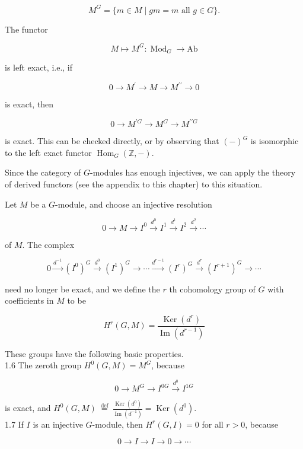 \documentclass[10pt]{article}
\begin{document}
$$
M^{G}=\{m \in M \mid g m=m \text { all } g \in G\} .
$$

The functor

$$
M \mapsto M^{G}: \operatorname{Mod}_{G} \rightarrow \mathrm{Ab}
$$

is left exact, i.e., if

$$
0 \rightarrow M^{\prime} \rightarrow M \rightarrow M^{\prime \prime} \rightarrow 0
$$

is exact, then

$$
0 \rightarrow M^{\prime G} \rightarrow M^{G} \rightarrow M^{\prime \prime G}
$$

is exact. This can be checked directly, or by observing that $(-)^{G}$ is isomorphic to the left exact functor $\operatorname{Hom}_{G}(\mathbb{Z},-)$.

Since the category of $G$-modules has enough injectives, we can apply the theory of derived functors (see the appendix to this chapter) to this situation.

Let $M$ be a $G$-module, and choose an injective resolution

$$
0 \rightarrow M \rightarrow I^{0} \xrightarrow{d^{0}} I^{1} \xrightarrow{d^{1}} I^{2} \xrightarrow{d^{2}} \cdots
$$

of $M$. The complex

$$
0 \xrightarrow{d^{-1}}\left(I^{0}\right)^{G} \xrightarrow{d^{0}}\left(I^{1}\right)^{G} \rightarrow \cdots \xrightarrow{d^{r-1}}\left(I^{r}\right)^{G} \xrightarrow{d^{r}}\left(I^{r+1}\right)^{G} \rightarrow \cdots
$$

need no longer be exact, and we define the $r$ th cohomology group of $G$ with coefficients in $M$ to be

$$
H^{r}(G, M)=\frac{\operatorname{Ker}\left(d^{r}\right)}{\operatorname{Im}\left(d^{r-1}\right)}
$$

These groups have the following basic properties.\\
1.6 The zeroth group $H^{0}(G, M)=M^{G}$, because

$$
0 \rightarrow M^{G} \rightarrow I^{0 G} \xrightarrow{d^{0}} I^{1 G}
$$

is exact, and $H^{0}(G, M) \stackrel{\text { def }}{=} \frac{\operatorname{Ker}\left(d^{0}\right)}{\operatorname{Im}\left(d^{-1}\right)}=\operatorname{Ker}\left(d^{0}\right)$.\\
1.7 If $I$ is an injective $G$-module, then $H^{r}(G, I)=0$ for all $r>0$, because

$$
0 \rightarrow I \rightarrow I \rightarrow 0 \rightarrow \cdots
$$
\end{document}
